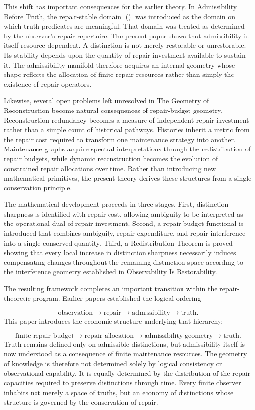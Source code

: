\documentclass[12pt,oneside]{article}
\theoremstyle{plain}
\theoremstyle{definition}
\theoremstyle{remark}
\DeclareMathOperator{\Rest}{Rest}
\begin{document}
This shift has important consequences for the earlier theory. In Admissibility Before Truth, the repair-stable domain \Rest() was introduced as the domain on which truth predicates are meaningful. That domain was treated as determined by the observer's repair repertoire. The present paper shows that admissibility is itself resource dependent. A distinction is not merely restorable or unrestorable. Its stability depends upon the quantity of repair investment available to sustain it. The admissibility manifold therefore acquires an internal geometry whose shape reflects the allocation of finite repair resources rather than simply the existence of repair operators.

Likewise, several open problems left unresolved in The Geometry of Reconstruction become natural consequences of repair-budget geometry. Reconstruction redundancy becomes a measure of independent repair investment rather than a simple count of historical pathways. Histories inherit a metric from the repair cost required to transform one maintenance strategy into another. Maintenance graphs acquire spectral interpretations through the redistribution of repair budgets, while dynamic reconstruction becomes the evolution of constrained repair allocations over time. Rather than introducing new mathematical primitives, the present theory derives these structures from a single conservation principle.

The mathematical development proceeds in three stages. First, distinction sharpness is identified with repair cost, allowing ambiguity to be interpreted as the operational dual of repair investment. Second, a repair budget functional is introduced that combines ambiguity, repair expenditure, and repair interference into a single conserved quantity. Third, a Redistribution Theorem is proved showing that every local increase in distinction sharpness necessarily induces compensating changes throughout the remaining distinction space according to the interference geometry established in Observability Is Restorability.

The resulting framework completes an important transition within the repair-theoretic program. Earlier papers established the logical ordering

\[
\text{observation}
\rightarrow
\text{repair}
\rightarrow
\text{admissibility}
\rightarrow
\text{truth}.
\]
This paper introduces the economic structure underlying that hierarchy:

\[
\text{finite repair budget}
\rightarrow
\text{repair allocation}
\rightarrow
\text{admissibility geometry}
\rightarrow
\text{truth}.
\]
Truth remains defined only on admissible distinctions, but admissibility itself is now understood as a consequence of finite maintenance resources. The geometry of knowledge is therefore not determined solely by logical consistency or observational capability. It is equally determined by the distribution of the repair capacities required to preserve distinctions through time. Every finite observer inhabits not merely a space of truths, but an economy of distinctions whose structure is governed by the conservation of repair.
\end{document}
